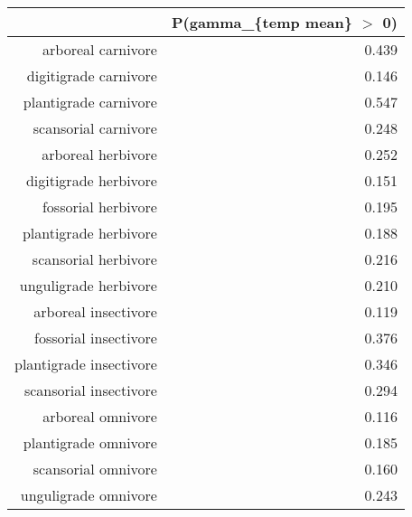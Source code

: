 \begin{table}[ht]
\centering
\begin{tabular}{rr}
  \hline
 & P(gamma\_\{temp mean\} $>$ 0) \\ 
  \hline
arboreal carnivore & 0.439 \\ 
  digitigrade carnivore & 0.146 \\ 
  plantigrade carnivore & 0.547 \\ 
  scansorial carnivore & 0.248 \\ 
  arboreal herbivore & 0.252 \\ 
  digitigrade herbivore & 0.151 \\ 
  fossorial herbivore & 0.195 \\ 
  plantigrade herbivore & 0.188 \\ 
  scansorial herbivore & 0.216 \\ 
  unguligrade herbivore & 0.210 \\ 
  arboreal insectivore & 0.119 \\ 
  fossorial insectivore & 0.376 \\ 
  plantigrade insectivore & 0.346 \\ 
  scansorial insectivore & 0.294 \\ 
  arboreal omnivore & 0.116 \\ 
  plantigrade omnivore & 0.185 \\ 
  scansorial omnivore & 0.160 \\ 
  unguligrade omnivore & 0.243 \\ 
   \hline
\end{tabular}
\label{tab:origin_temp}
\end{table}
